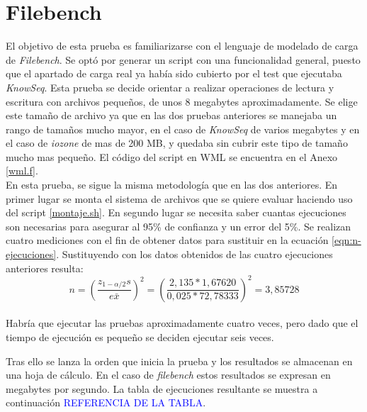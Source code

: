 \section{Filebench}
El objetivo de esta prueba es familiarizarse con el lenguaje de modelado de carga de \textit{Filebench}. Se optó por generar un script con una funcionalidad general, puesto que el apartado de carga real ya había sido cubierto por el test que ejecutaba \textit{KnowSeq}. Esta prueba se decide orientar a realizar operaciones de lectura y escritura con archivos pequeños, de unos 8 megabytes aproximadamente. Se elige este tamaño de archivo ya que en las dos pruebas anteriores se manejaba un rango de tamaños mucho mayor, en el caso de \textit{KnowSeq} de varios megabytes y en el caso de \textit{iozone} de mas de 200 MB, y quedaba sin cubrir este tipo de tamaño mucho mas pequeño. El código del script en WML se encuentra en el Anexo \ref{wml.f}.\\

En esta prueba, se sigue la misma metodología que en las dos anteriores. En primer lugar se monta el sistema de archivos que se quiere evaluar haciendo uso del script \ref{montaje.sh}. En segundo lugar se necesita saber cuantas ejecuciones son necesarias para asegurar al 95\% de confianza y un error del 5\%. Se realizan cuatro mediciones con el fin de obtener datos para sustituir en la ecuación \ref{eqn:n-ejecuciones}. Sustituyendo con los datos obtenidos de las cuatro ejecuciones anteriores resulta: $$
n=\left(\frac{z_{1-\alpha / 2} s}{e \bar{x}}\right)^{2} = \left(\frac{2,135*1,67620}{0,025*72,78333}\right)^{2} = 3,85728
$$\\

Habría que ejecutar las pruebas aproximadamente cuatro veces, pero dado que el tiempo de ejecución es pequeño se deciden ejecutar seis veces.

Tras ello se lanza la orden que inicia la prueba y los resultados se almacenan en una hoja de cálculo. En el caso de \textit{filebench} estos resultados se expresan en megabytes por segundo. La tabla de ejecuciones resultante se muestra a continuación \textcolor{blue}{REFERENCIA DE LA TABLA}.
 

